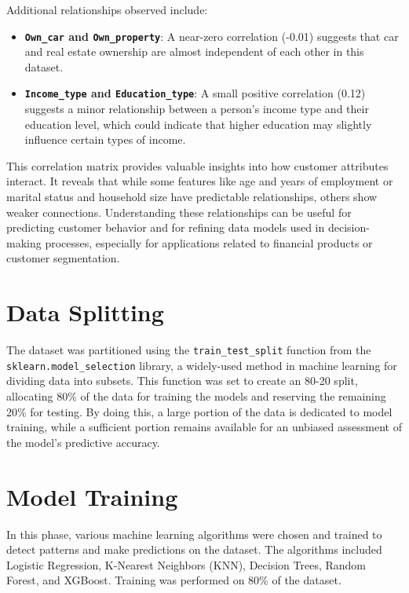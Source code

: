 \documentclass[12pt]{report}
\begin{document}
    Additional relationships observed include:

    \begin{itemize}
        \item {\bfseries \texttt{Own\_car} and \texttt{Own\_property}}: A near-zero correlation (-0.01) suggests that car and real estate ownership are almost independent of each other in this dataset.
        \item {\bfseries \texttt{Income\_type} and \texttt{Education\_type}}: A small positive correlation (0.12) suggests a minor relationship between a person’s income type and their education level, which could indicate that higher education may slightly influence certain types of income.
    \end{itemize}

    This correlation matrix provides valuable insights into how customer attributes interact. It reveals that while some features like age and years of employment or marital status and household size have predictable relationships, others show weaker connections. Understanding these relationships can be useful for predicting customer behavior and for refining data models used in decision-making processes, especially for applications related to financial products or customer segmentation.

    \section{Data Splitting}
    The dataset was partitioned using the \texttt{train\_test\_split} function from the \texttt{sklearn.model\_selection} library, a widely-used method in machine learning for dividing data into subsets. This function was set to create an 80-20 split, allocating 80\% of the data for training the models and reserving the remaining 20\% for testing. By doing this, a large portion of the data is dedicated to model training, while a sufficient portion remains available for an unbiased assessment of the model's predictive accuracy.

    \section{Model Training}
    In this phase, various machine learning algorithms were chosen and trained to detect patterns and make predictions on the dataset. The algorithms included Logistic Regression, K-Nearest Neighbors (KNN), Decision Trees, Random Forest, and XGBoost. Training was performed on 80\% of the dataset.
\end{document}
